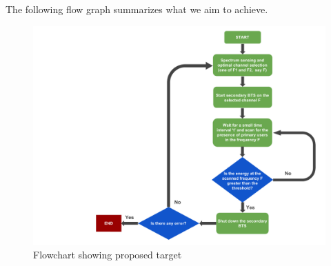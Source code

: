 
The following flow graph summarizes what we aim to achieve.

\begin{figure}[h]
\centering
\includegraphics[width=1\textwidth]{workFlowchart}
\caption{Flowchart showing proposed target}
\label{workFlowchart}
\end{figure}

